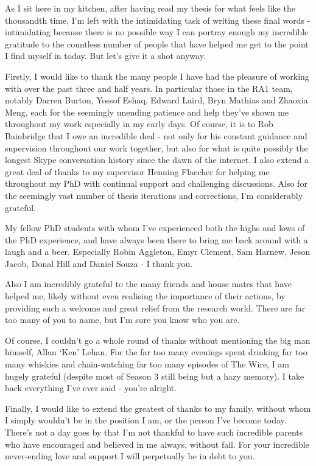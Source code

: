 
\begin{acknowledgements}      

\begin{spacing}{1}
As I sit here in my kitchen, after having read my thesis for what feels like
the
thousandth time, I'm left with the intimidating task of writing these final
words - intimidating because there is no possible way I can portray enough my
incredible gratitude to the countless number of people that have helped me
get to the point I find myself in today. But let's give it a shot anyway.

Firstly, I would like to thank the many people I have had the pleasure of
working with
over the past three and half years. In particular those in
the RA1 team, notably Darren Burton, Yossof Eshaq, Edward
Laird, Bryn Mathias and Zhaoxia Meng, each for the seemingly unending patience
and help
they've shown me throughout my work especially in my early days. Of course, it
is to Rob Bainbridge that I
owe an incredible deal - not only for his constant guidance and supervision
throughout our work together, but also for what is quite possibly the longest
Skype conversation history since the dawn of the internet.
I also extend a great deal of thanks to my supervisor Henning Flaecher for
helping me throughout my PhD with continual support and challenging discussions.
Also for the seemingly vast number of thesis iterations and corrections, I'm
considerably grateful.

My fellow PhD students with whom I've experienced both the highs and lows of
the PhD experience, and have always been there to bring me back around with a
laugh
and a beer. Especially Robin Aggleton, Emyr Clement, Sam Harnew, Jeson Jacob,
Donal Hill
and Daniel Souza - I thank you.

Also I am incredibly grateful to the many friends and house mates that have
helped me, likely without even realising the importance of their actions, by
providing such a welcome and great relief from the research world. There are
far too many of you to name, but I'm sure you know who you are.

Of course, I couldn't go a whole round of thanks without mentioning the big man
himself, Allan `Ken' Lehan. For the far too many evenings spent
drinking far too many whiskies and chain-watching far too many episodes of The
Wire, I am hugely grateful (despite most of Season 3 still being but a hazy
memory). I take back everything I've ever said - you're alright.

Finally, I would like to extend the greatest of thanks to my family, without whom
I simply wouldn't be in the position I am, or the person I've become today.
There's not a day goes by that I'm not thankful to have such incredible parents
who have encouraged and believed in me always, without fail.
For your incredible never-ending love and support I will perpetually be in debt
to you.
\end{spacing}

\end{acknowledgements}

